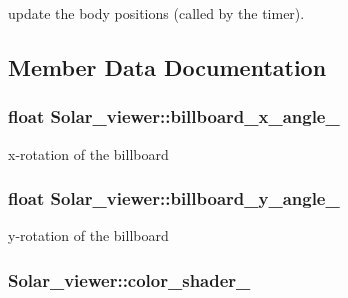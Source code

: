 update the body positions (called by the timer). 



\subsection{Member Data Documentation}
\subsubsection[{\texorpdfstring{billboard\+\_\+x\+\_\+angle\+\_\+}{billboard_x_angle_}}]{\setlength{\rightskip}{0pt plus 5cm}float Solar\+\_\+viewer\+::billboard\+\_\+x\+\_\+angle\+\_\+\hspace{0.3cm}{\ttfamily [private]}}\hypertarget{classSolar__viewer_adf92f5eeae577e1178a4e8216abb87bb}{}\label{classSolar__viewer_adf92f5eeae577e1178a4e8216abb87bb}


x-\/rotation of the billboard 

\subsubsection[{\texorpdfstring{billboard\+\_\+y\+\_\+angle\+\_\+}{billboard_y_angle_}}]{\setlength{\rightskip}{0pt plus 5cm}float Solar\+\_\+viewer\+::billboard\+\_\+y\+\_\+angle\+\_\+\hspace{0.3cm}{\ttfamily [private]}}\hypertarget{classSolar__viewer_af91dd8490128e7b955fee3a166db7c3f}{}\label{classSolar__viewer_af91dd8490128e7b955fee3a166db7c3f}


y-\/rotation of the billboard 

\subsubsection[{\texorpdfstring{color\+\_\+shader\+\_\+}{color_shader_}}]{ Solar\+\_\+viewer\+::color\+\_\+shader\+\_\+\hspace{0.3cm}{\ttfamily [private]}}\hypertarget{classSolar__viewer_aed950d77f461e1ce32ba1dcf3898b814}{}\label{classSolar__viewer_aed950d77f461e1ce32ba1dcf3898b814}


